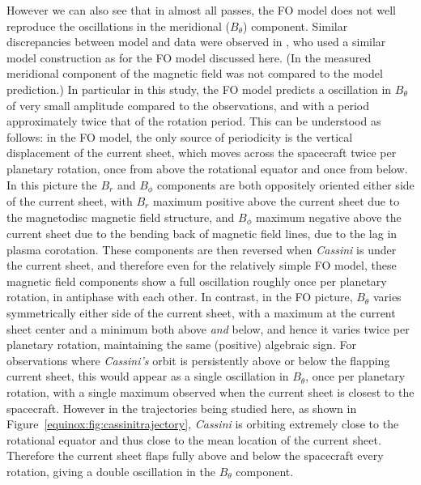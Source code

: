 However we can also see that in almost all passes, the FO model does not well reproduce the oscillations in the meridional ($B_{\theta}$) component. Similar discrepancies between model and data were observed in \citet{achilleos2014}, who used a similar model construction as for the FO model discussed here. (In \citet{arridge2011} the measured meridional component of the magnetic field was not compared to the model prediction.) In particular in this study, the FO model predicts a oscillation in $B_{\theta}$ of very small amplitude compared to the observations, and with a period approximately twice that of the rotation period. This can be understood as follows: in the FO model, the only source of periodicity is the vertical displacement of the current sheet, which moves across the spacecraft twice per planetary rotation, once from above the rotational equator and once from below. In this picture the $B_{r}$ and $B_{\phi}$ components are both oppositely oriented either side of the current sheet, with $B_{r}$ maximum positive above the current sheet due to the magnetodisc magnetic field structure, and $B_{\phi}$ maximum negative above the current sheet due to the bending back of magnetic field lines, due to the lag in plasma corotation. These components are then reversed when \textit{Cassini} is under the current sheet, and therefore even for the relatively simple FO model, these magnetic field components show a full oscillation roughly once per planetary rotation, in antiphase with each other. In contrast, in the FO picture, $B_{\theta}$ varies symmetrically either side of the current sheet, with a maximum at the current sheet center and a minimum both above \textit{and} below, and hence it varies twice per planetary rotation, maintaining the same (positive) algebraic sign. For observations where \textit{Cassini's} orbit is persistently above or below the flapping current sheet, this would appear as a single oscillation in $B_{\theta}$, once per planetary rotation, with a single maximum observed when the current sheet is closest to the spacecraft. However in the trajectories being studied here, as shown in Figure~\ref{equinox:fig:cassinitrajectory}, \textit{Cassini} is orbiting extremely close to the rotational equator and thus close to the mean location of the current sheet. Therefore the current sheet flaps fully above and below the spacecraft every rotation, giving a double oscillation in the $B_{\theta}$ component.

